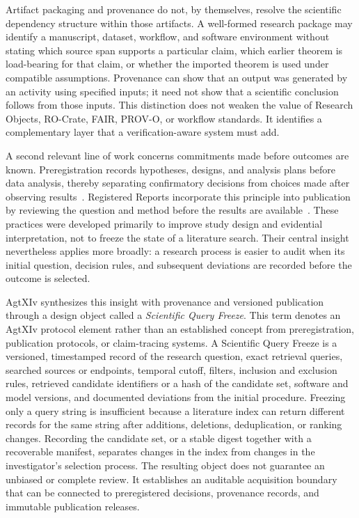 Artifact packaging and provenance do not, by themselves, resolve the scientific dependency structure within those artifacts. A well-formed research package may identify a manuscript, dataset, workflow, and software environment without stating which source span supports a particular claim, which earlier theorem is load-bearing for that claim, or whether the imported theorem is used under compatible assumptions. Provenance can show that an output was generated by an activity using specified inputs; it need not show that a scientific conclusion follows from those inputs. This distinction does not weaken the value of Research Objects, RO-Crate, FAIR, PROV-O, or workflow standards. It identifies a complementary layer that a verification-aware system must add.

A second relevant line of work concerns commitments made before outcomes are known. Preregistration records hypotheses, designs, and analysis plans before data analysis, thereby separating confirmatory decisions from choices made after observing results~\cite{nosek2018preregistration}. Registered Reports incorporate this principle into publication by reviewing the question and method before the results are available~\cite{chambers2013registered}. These practices were developed primarily to improve study design and evidential interpretation, not to freeze the state of a literature search. Their central insight nevertheless applies more broadly: a research process is easier to audit when its initial question, decision rules, and subsequent deviations are recorded before the outcome is selected.

AgtXIv synthesizes this insight with provenance and versioned publication through a design object called a \emph{Scientific Query Freeze}. This term denotes an AgtXIv protocol element rather than an established concept from preregistration, publication protocols, or claim-tracing systems. A Scientific Query Freeze is a versioned, timestamped record of the research question, exact retrieval queries, searched sources or endpoints, temporal cutoff, filters, inclusion and exclusion rules, retrieved candidate identifiers or a hash of the candidate set, software and model versions, and documented deviations from the initial procedure. Freezing only a query string is insufficient because a literature index can return different records for the same string after additions, deletions, deduplication, or ranking changes. Recording the candidate set, or a stable digest together with a recoverable manifest, separates changes in the index from changes in the investigator's selection process. The resulting object does not guarantee an unbiased or complete review. It establishes an auditable acquisition boundary that can be connected to preregistered decisions, provenance records, and immutable publication releases.

